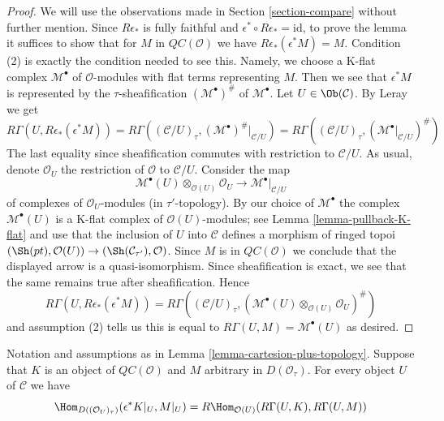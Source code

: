 \begin{proof}
We will use the observations made in Section \ref{section-compare} without
further mention. Since $R\epsilon_*$
is fully faithful and $\epsilon^* \circ R\epsilon_* = \text{id}$,
to prove the lemma it suffices to show that for $M$ in
$\mathit{QC}(\mathcal{O})$ we have $R\epsilon_*(\epsilon^*M) = M$.
Condition (2) is exactly the condition needed to see this.
Namely, we choose a K-flat complex $\mathcal{M}^\bullet$
of $\mathcal{O}$-modules with flat terms representing $M$.
Then we see that $\epsilon^*M$ is represented by the $\tau$-sheafification
$(\mathcal{M}^\bullet)^\#$ of $\mathcal{M}^\bullet$.
Let $U \in \Ob(\mathcal{C})$. By Leray we get
$$
R\Gamma(U, R\epsilon_*(\epsilon^*M)) =
R\Gamma((\mathcal{C}/U)_\tau, (\mathcal{M}^\bullet)^\#|_{\mathcal{C}/U}) =
R\Gamma((\mathcal{C}/U)_\tau, (\mathcal{M}^\bullet|_{\mathcal{C}/U})^\#)
$$
The last equality since
sheafification commutes with restriction to $\mathcal{C}/U$.
As usual, denote $\mathcal{O}_U$ the restriction of $\mathcal{O}$ to
$\mathcal{C}/U$. Consider the map
$$
\mathcal{M}^\bullet(U) \otimes_{\mathcal{O}(U)} \mathcal{O}_U
\longrightarrow
\mathcal{M}^\bullet|_{\mathcal{C}/U}
$$
of complexes of $\mathcal{O}_U$-modules (in $\tau'$-topology).
By our choice of $\mathcal{M}^\bullet$ the complex $\mathcal{M}^\bullet(U)$
is a K-flat complex of $\mathcal{O}(U)$-modules; see
Lemma \ref{lemma-pullback-K-flat} and use that the inclusion
of $U$ into $\mathcal{C}$ defines a morphism of ringed topoi
$(\Sh(pt), \mathcal{O}(U)) \to (\Sh(\mathcal{C}_{\tau'}), \mathcal{O})$.
Since $M$ is in $\mathit{QC}(\mathcal{O})$ we conclude that
the displayed arrow is a quasi-isomorphism. Since sheafification
is exact, we see that the same remains true after sheafification.
Hence
$$
R\Gamma(U, R\epsilon_*(\epsilon^*M)) =
R\Gamma((\mathcal{C}/U)_\tau,
(\mathcal{M}^\bullet(U) \otimes_{\mathcal{O}(U)} \mathcal{O}_U)^\#)
$$
and assumption (2) tells us this is equal to
$R\Gamma(U, M) = \mathcal{M}^\bullet(U)$ as desired.
\end{proof}

\begin{lemma}
\label{lemma-QC-hom-out-of-plus-topology}
Notation and assumptions as in Lemma \ref{lemma-cartesion-plus-topology}.
Suppose that $K$ is an object of
$\mathit{QC}(\mathcal{O})$ and $M$ arbitrary in $D(\mathcal{O}_\tau)$.
For every object $U$ of $\mathcal{C}$ we have
$$
\Hom_{D((\mathcal{O}_U)_\tau)}(\epsilon^*K|_U, M|_U) =
R\Hom_{\mathcal{O}(U)}(R\Gamma(U, K), R\Gamma(U, M))
$$
\end{lemma}


